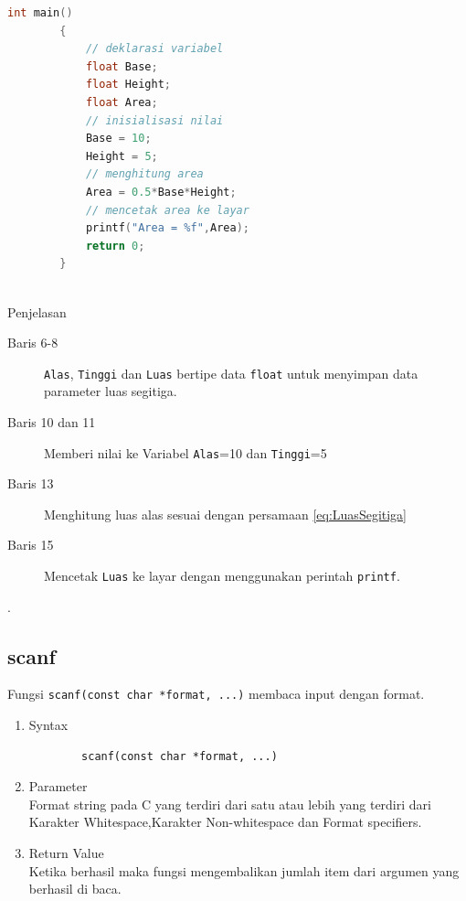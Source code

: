 \begin{description}
\begin{lstlisting}[language=c,captionpos=t]
		int main()
		{
			// deklarasi variabel
			float Base;
			float Height;
			float Area;
			// inisialisasi nilai
			Base = 10;
			Height = 5;
			// menghitung area
			Area = 0.5*Base*Height;
			// mencetak area ke layar
			printf("Area = %f",Area);
			return 0;
		}
		
	\end{lstlisting}

		Penjelasan
		\begin{description}
			\item[Baris 6-8]  \verb|Alas|, \verb|Tinggi| dan \verb|Luas| bertipe data \verb|float| untuk menyimpan data parameter luas segitiga.
			\item[Baris 10 dan 11] Memberi nilai ke Variabel \verb|Alas|=10 dan \verb|Tinggi|=5
			\item[Baris 13] Menghitung luas alas sesuai dengan persamaan \ref{eq:LuasSegitiga}
			\item[Baris 15] Mencetak \verb|Luas| ke layar dengan menggunakan perintah \verb|printf|.
		\end{description}
\end{description}

.\subsection{scanf}
Fungsi  \verb*|scanf(const char *format, ...)| membaca input dengan format.

\begin{enumerate}
	\item Syntax
	      \begin{verbatim}
		scanf(const char *format, ...)
	\end{verbatim}
	\item Parameter \\
	      Format string pada C yang terdiri dari satu atau lebih yang terdiri dari \\
	      Karakter Whitespace,Karakter Non-whitespace  dan  Format specifiers.
	\item Return Value \\
	      Ketika berhasil maka fungsi mengembalikan jumlah item dari argumen yang berhasil di baca.

\end{enumerate}

